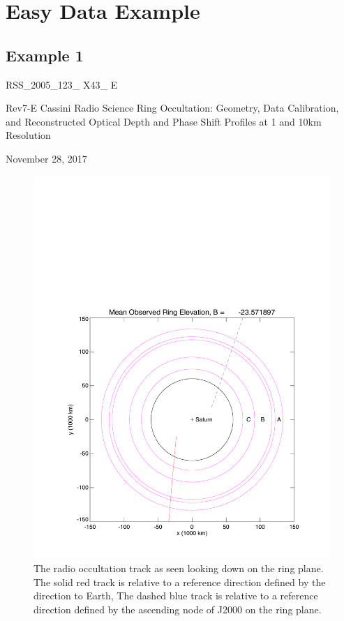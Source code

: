 \documentclass[crop=false,class=book]{standalone}
\begin{document}
\chapter{Easy Data Example}
\section{Example 1}
\begin{center}
    \LARGE{RSS\_2005\_123\_ X43\_ E \par
    Rev7-E Cassini Radio Science Ring Occultation: Geometry, Data Calibration, and Reconstructed Optical Depth and Phase Shift Profiles at 1 and 10km Resolution \par
    November 28, 2017\par}
\end{center}
\begin{figure}[H]
    \centering
    \includegraphics[page=1,trim = {0.67in 0.5in 0.5in 3.1in},clip,width=\textwidth]{Rev007_E_X43_summary_p1_08FEB2018.pdf}
    \caption*{The radio occultation track as seen looking down on the ring plane. The solid red track is relative to a reference direction defined by the direction to Earth, The dashed blue track is relative to a reference direction defined by the ascending node of J2000 on the ring plane.}
\end{figure}
\end{document}

